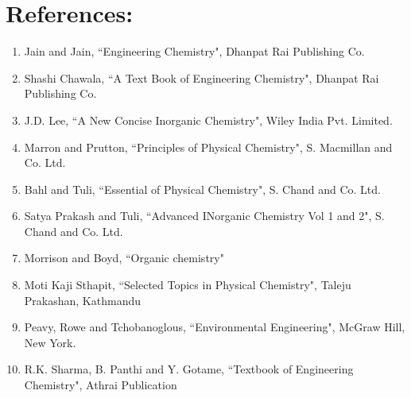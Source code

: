 \section*{References:}
\begin{enumerate}
    \item Jain and Jain, ``Engineering Chemistry", Dhanpat Rai Publishing Co.
    \item Shashi Chawala, ``A Text Book of Engineering Chemistry", Dhanpat Rai Publishing Co.
    \item J.D. Lee, ``A New Concise Inorganic Chemistry", Wiley India Pvt. Limited.
    \item Marron and Prutton, ``Principles of Physical Chemistry", S. Macmillan and Co. Ltd.
    \item Bahl and Tuli, ``Essential of Physical Chemistry", S. Chand and Co. Ltd.
    \item Satya Prakash and Tuli, ``Advanced INorganic Chemistry Vol 1 and 2", S. Chand and Co. Ltd.
    \item Morrison and Boyd, ``Organic chemistry"
    \item Moti Kaji Sthapit, ``Selected Topics in Physical Chemistry", Taleju Prakashan, Kathmandu
    \item Peavy, Rowe and Tchobanoglous, ``Environmental Engineering", McGraw Hill, New York.
    \item R.K. Sharma, B. Panthi and Y. Gotame, ``Textbook of Engineering Chemistry", Athrai Publication
    
\end{enumerate}